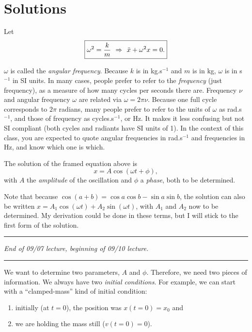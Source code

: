 \documentclass[11pt]{article}
\begin{document}
    \hypertarget{solutions}{%
\section{Solutions}\label{solutions}}

Let
\[\boxed{ \large \omega^2 = \frac{k}{m} \ \Rightarrow \ \ddot{x} + \omega^2 x = 0.} \]

    \(\omega\) is called the \emph{angular frequency}. Because \(k\) is in
kg.s\(^{-1}\) and \(m\) is in kg, \(\omega\) is in s\(^{-1}\) in SI
units. In many cases, people prefer to refer to the \emph{frequency}
(just frequency), as a measure of how many cycles per seconds there are.
Frequency \(\nu\) and angular frequency \(\omega\) are related via
\(\omega = 2\pi \nu\). Because one full cycle corresponds to \(2\pi\)
radians, many people prefer to refer to the units of \(\omega\) as
rad.s\(^{-1}\), and those of frequency as cycles.s\(^{-1}\), or Hz. It
makes it less confusing but not SI compliant (both cycles and radiants
have SI units of 1). In the context of this class, you are expected to
quote angular frequencies in rad.s\(^{-1}\) and frequencies in Hz, and
know which one is which.

    The solution of the framed equation above is
\[ x = A\cos(\omega t + \phi), \] with \(A\) the \emph{amplitude} of the
oscillation and \(\phi\) a \emph{phase}, both to be determined.

Note that because \(\cos(a+b) = \cos{a}\cos{b} - \sin{a}\sin{b}\), the
solution can also be written
\(x = A_1\cos(\omega t) + A_2\sin(\omega t)\), with \(A_1\) and \(A_2\)
now to be determined. My derivation could be done in these terms, but I
will stick to the first form of the solution.

    \begin{center}\rule{0.5\linewidth}{\linethickness}\end{center}

\emph{End of 09/07 lecture, beginning of 09/10 lecture.}

\begin{center}\rule{0.5\linewidth}{\linethickness}\end{center}

    We want to determine two parameters, \(A\) and \(\phi\). Therefore, we
need two pieces of information. We always have two \emph{initial
conditions}. For example, we can start with a ``clamped-mass'' kind of
initial condition:

\begin{enumerate}
\def\labelenumi{\arabic{enumi}.}
\item
  initially (at \(t=0\)), the position was \(x(t=0) = x_0\) and
\item
  we are holding the mass still (\(v(t=0)=0\)).
\end{enumerate}
\end{document}

